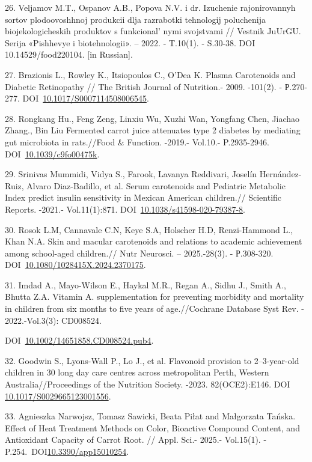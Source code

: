 \begin{refs}
26. Veljamov M.T., Ospanov A.B., Popova N.V. i dr. Izuchenie
rajonirovannyh sortov plodoovoshhnoj produkcii dlja razrabotki
tehnologij poluchenija biojekologicheskih produktov s
funkcional' nymi svojs\-tvami // Vestnik JuUrGU. Serija
«Pishhevye i biotehnologii». -- 2022. - T.10(1). - S.30-38. DOI\\
10.14529/food220104. {[}in Russian{]}.

27. Brazionis L., Rowley K., Itsiopoulos C., O'Dea K. Plasma Carotenoids
and Diabetic Retinopathy // The British Journal of Nutrition.- 2009.
-101(2). - Р.270-277.
DOI~\href{https://doi.org/10.1017/s0007114508006545}{10.1017/S0007114508006545}.

28. Rongkang Hu., Feng Zeng, Linxiu Wu, Xuzhi Wan, Yongfang Chen,
Jiachao Zhang., Bin Liu Ferment\-ed carrot juice attenuates type 2
diabetes by mediating gut microbiota in rats.//Food \& Function. -2019.-
Vol.10.- P.2935-2946.
DOI~\href{https://doi.org/10.1039/c9fo00475k}{10.1039/c9fo00475k}.

29. Srinivas Mummidi, Vidya S., Farook, Lavanya Reddivari, Joselín
Hernández-Ruiz, Alvaro Diaz-Badillo, et al. Serum carotenoids and
Pediatric Metabolic Index predict insulin sensitivity in Mexican
American children.// Scientific Reports. -2021.- Vol.11(1):871.
DOI~\href{https://doi.org/10.1038/s41598-020-79387-8}{10.1038/s41598-020-79387-8}.

30. Rosok L.M, Cannavale C.N, Keye S.A, Holscher H.D, Renzi-Hammond L.,
Khan N.A. Skin and macular carotenoids and relations to academic
achievement among school-aged children.// Nutr Neurosci. -- 2025.-28(3).
- Р.308-320.
DOI~\href{https://doi.org/10.1080/1028415x.2024.2370175}{10.1080/1028415X.2024.2370175}.

31. Imdad A., Mayo-Wilson E., Haykal M.R., Regan A., Sidhu J., Smith A.,
Bhutta Z.A. Vitamin A. supplementation for preventing morbidity and
mortality in children from six months to five years of age.//Cochrane
Database Syst Rev. - 2022.-Vol.3(3): CD008524.

DOI~\href{https://doi.org/10.1002/14651858.cd008524.pub4}{10.1002/14651858.CD008524.pub4}.

32. Goodwin S., Lyons-Wall P., Lo J., et al. Flavonoid provision to
2--3-year-old children in 30 long day care centres across metropolitan
Perth, Western Australia//Proceedings of the Nutrition Society. -2023.
82(OCE2):E146. DOI
\href{http://dx.doi.org/10.1017/S0029665123001556}{10.1017/S0029665123001556}.

33. Agnieszka Narwojsz, Tomasz Sawicki, Beata Piłat and Małgorzata
Tańska. Effect of Heat Treatment Methods on Color, Bioactive Compound
Content, and Antioxidant Capacity of Carrot Root. // Appl. Sci.- 2025.-
Vol.15(1). -
P.254.~DOI\href{http://dx.doi.org/10.3390/app15010254}{10.3390/app15010254}.


\end{refs}
